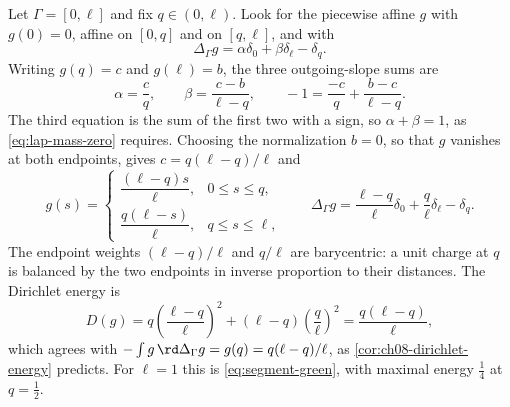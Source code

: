 \begin{example}
\label{ex:ch08-green-segment}
Let $\Gamma=[0,\ell]$ and fix $q\in(0,\ell)$.  Look for the piecewise affine
$g$ with $g(0)=0$, affine on $[0,q]$ and on $[q,\ell]$, and with
\[
                    \Delta_\Gamma g=\alpha\delta_0+\beta\delta_\ell-\delta_q .
\]
Writing $g(q)=c$ and $g(\ell)=b$, the three outgoing-slope sums are
\[
 \alpha=\frac{c}{q},\qquad
 \beta=\frac{c-b}{\ell-q},\qquad
 -1=\frac{-c}{q}+\frac{b-c}{\ell-q} .
\]
The third equation is the sum of the first two with a sign, so
$\alpha+\beta=1$, as \eqref{eq:lap-mass-zero} requires.  Choosing the
normalization $b=0$, so that $g$ vanishes at both endpoints, gives
$c=q(\ell-q)/\ell$ and
\begin{equation}
\label{eq:ch08-green-segment}
 g(s)=
 \begin{cases}
  \dfrac{(\ell-q)s}{\ell}, & 0\leq s\leq q,\\[2mm]
  \dfrac{q(\ell-s)}{\ell}, & q\leq s\leq \ell,
 \end{cases}
 \qquad
 \Delta_\Gamma g=\frac{\ell-q}{\ell}\delta_0+\frac{q}{\ell}\delta_\ell
                 -\delta_q .
\end{equation}
The endpoint weights $(\ell-q)/\ell$ and $q/\ell$ are barycentric: a unit
charge at $q$ is balanced by the two endpoints in inverse proportion to
their distances.  The Dirichlet energy is
\[
 D(g)=q\left(\frac{\ell-q}{\ell}\right)^2
      +(\ell-q)\left(\frac{q}{\ell}\right)^2
     =\frac{q(\ell-q)}{\ell},
\]
which agrees with $-\int g\,\rd\Delta_\Gamma g=g(q)=q(\ell-q)/\ell$, as
\cref{cor:ch08-dirichlet-energy} predicts.  For $\ell=1$ this is
\eqref{eq:segment-green}, with maximal energy $\tfrac14$ at $q=\tfrac12$.
\end{example}

